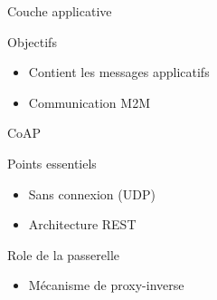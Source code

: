 
\begin{frame}{Couche applicative}
  \begin{block}{Objectifs}
    \begin{itemize}
      \item Contient les messages applicatifs
      \item Communication M2M
    \end{itemize}
  \end{block}

  \pnote{

  }
\end{frame}

\begin{frame}{CoAP}
  \begin{block}{Points essentiels}
    \begin{itemize}
      \item Sans connexion (UDP)
      \item Architecture REST
    \end{itemize}
  \end{block}
  \begin{block}{Role de la passerelle}
    \begin{itemize}
      \item Mécanisme de proxy-inverse
    \end{itemize}
  \end{block}
\end{frame}
